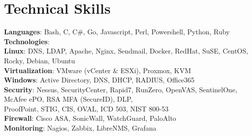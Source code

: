 \section{Technical Skills}
    \begin{itemize}[leftmargin=0.15in, label={}]
	\small{\item{
		\textbf{Languages}{: Bash, C, C\#, Go, Javascript, Perl, Powershell, Python, Ruby} \\
		\textbf{Technologies}{:} \\
        \hspace{1em}\textbf{Linux}: DNS, LDAP, Apache, Nginx, Sendmail, Docker, RedHat, SuSE, CentOS, Rocky, Debian, Ubuntu\\
        \hspace{1em}\textbf{Virtualization}: VMware (vCenter \& ESXi), Proxmox, KVM\\
        \hspace{1em}\textbf{Windows}: Active Directory, DNS, DHCP, RADIUS, Office365\\
        \hspace{1em}\textbf{Security}: Nessus, SecurityCenter, Rapid7, RunZero, OpenVAS, SentinelOne, McAfee ePO, RSA MFA (SecureID), DLP,\\
        \hspace{5.3em}ProofPoint, STIG, CIS, OVAL, ICD 503, NIST 800-53\\
        \hspace{1em}\textbf{Firewall}: Cisco ASA, SonicWall, WatchGuard, PaloAlto\\
        \hspace{1em}\textbf{Monitoring}: Nagios, Zabbix, LibreNMS, Grafana
	}}
    \end{itemize}